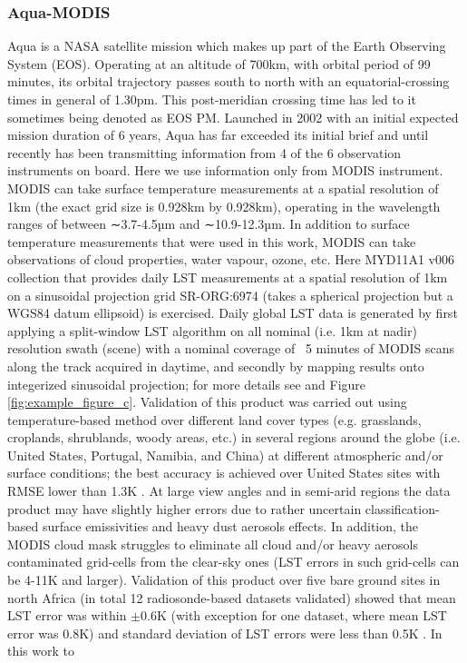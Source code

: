 \documentclass[hess, twostagejnl]{copernicus}
\begin{document}
\subsubsection{Aqua-MODIS}


\noindent Aqua  \citep{aquaref} is a NASA satellite mission which makes up part of the Earth Observing System (EOS). Operating at an altitude of 700km, with orbital period of 99 minutes, its orbital trajectory passes south to north with an equatorial-crossing times in general of 1.30pm. This post-meridian crossing time has led to it sometimes being denoted as EOS PM. Launched in 2002 with an initial expected mission duration of 6 years, Aqua has far exceeded its initial brief and until recently has been transmitting information from 4 of the 6 observation instruments on board. Here we use information only from MODIS instrument. MODIS can take surface temperature measurements at a spatial resolution of 1km (the exact grid size is 0.928km by 0.928km), operating in the wavelength ranges of between ∼3.7-4.5µm and ∼10.9-12.3µm. In addition to surface temperature measurements that were used in this work, MODIS can take observations of cloud properties, water vapour, ozone, etc. Here MYD11A1 v006 \citep{MODISusersguide} collection that provides daily LST measurements at a spatial resolution of 1km on a sinusoidal projection grid SR-ORG:6974 (takes a spherical projection but a WGS84 datum ellipsoid) is exercised. Daily global LST data is generated by first applying a split-window LST algorithm \citep{508406} on all nominal (i.e. 1km at nadir) resolution swath (scene) with a nominal coverage of ~5 minutes of MODIS scans along the track acquired in daytime, and secondly by mapping results onto integerized sinusoidal projection; for more details see \cite{MODISusersguide} and Figure \ref{fig:example_figure_c}. Validation of this product was carried out using temperature-based method over different land cover types (e.g. grasslands, croplands, shrublands, woody areas, etc.) in several regions around the globe (i.e. United States, Portugal, Namibia, and China) at different atmospheric and/or surface conditions; the best accuracy is achieved over United States sites with RMSE lower than 1.3K \citep{DUAN201916}. At large view angles and in semi-arid regions the data product may have slightly higher errors due to rather uncertain classification-based surface emissivities and heavy dust aerosols effects. In addition, the MODIS cloud mask struggles to eliminate all cloud and/or heavy aerosols contaminated grid-cells from the clear-sky ones (LST errors in such grid-cells can be 4-11K and larger). Validation of this product over five bare ground sites in north Africa (in total 12 radiosonde-based datasets validated) showed that mean LST error was within $\pm$0.6K (with exception for one dataset, where mean LST error was 0.8K) and standard deviation of LST errors were less than 0.5K \citep{DUAN201916}. In this work to 
\end{document}
